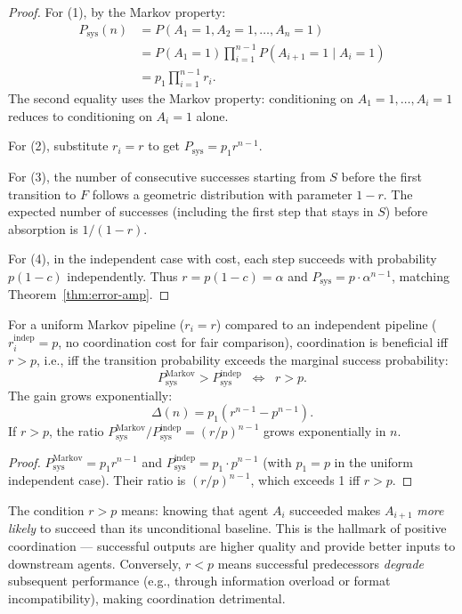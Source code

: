 \begin{proof}
For (1), by the Markov property:
\begin{align*}
  P_{\mathrm{sys}}(n) &= P(A_1 = 1, A_2 = 1, \ldots, A_n = 1) \\
  &= P(A_1 = 1) \prod_{i=1}^{n-1} P(A_{i+1} = 1 \mid A_i = 1) \\
  &= p_1 \prod_{i=1}^{n-1} r_i.
\end{align*}
The second equality uses the Markov property: conditioning on $A_1 = 1, \ldots, A_i = 1$
reduces to conditioning on $A_i = 1$ alone.

For (2), substitute $r_i = r$ to get $P_{\mathrm{sys}} = p_1 r^{n-1}$.

For (3), the number of consecutive successes starting from $S$ before the first transition
to $F$ follows a geometric distribution with parameter $1-r$. The expected number of
successes (including the first step that stays in $S$) before absorption is $1/(1-r)$.

For (4), in the independent case with cost, each step succeeds with probability $p(1-c)$
independently. Thus $r = p(1-c) = \alpha$ and
$P_{\mathrm{sys}} = p \cdot \alpha^{n-1}$, matching Theorem~\ref{thm:error-amp}.
\end{proof}

\begin{corollary}
\label{cor:markov-vs-indep}
For a uniform Markov pipeline ($r_i = r$) compared to an independent pipeline
($r_i^{\mathrm{indep}} = p$, no coordination cost for fair comparison), coordination
is beneficial iff $r > p$, i.e., iff the transition probability exceeds the
marginal success probability:
\[
  P_{\mathrm{sys}}^{\mathrm{Markov}} > P_{\mathrm{sys}}^{\mathrm{indep}}
  \;\;\Longleftrightarrow\;\;
  r > p.
\]
The gain grows exponentially:
\[
  \Delta(n) = p_1(r^{n-1} - p^{n-1}).
\]
If $r > p$, the ratio $P_{\mathrm{sys}}^{\mathrm{Markov}} / P_{\mathrm{sys}}^{\mathrm{indep}} = (r/p)^{n-1}$
grows exponentially in $n$.
\end{corollary}

\begin{proof}
$P_{\mathrm{sys}}^{\mathrm{Markov}} = p_1 r^{n-1}$ and $P_{\mathrm{sys}}^{\mathrm{indep}} = p_1 \cdot p^{n-1}$
(with $p_1 = p$ in the uniform independent case). Their ratio is $(r/p)^{n-1}$,
which exceeds 1 iff $r > p$.
\end{proof}

\begin{remark}[Interpretation]
The condition $r > p$ means: knowing that agent $A_i$ succeeded makes $A_{i+1}$
\emph{more likely} to succeed than its unconditional baseline. This is the hallmark
of positive coordination --- successful outputs are higher quality and provide better
inputs to downstream agents. Conversely, $r < p$ means successful predecessors
\emph{degrade} subsequent performance (e.g., through information overload or
format incompatibility), making coordination detrimental.
\end{remark}

